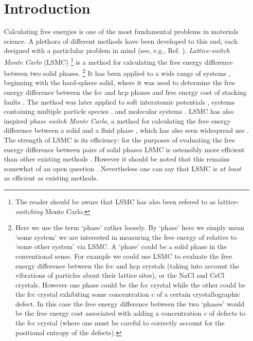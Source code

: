 \documentclass{report}
\begin{document}
\chapter{Introduction}
Calculating free energies is one of the most fundamental problems in materials science.
A plethora of different methods have been developed to this end, each designed with a particlular problem in mind (see, e.g., Ref. \cite{book:Frenkel}).
%
\emph{Lattice-switch Monte Carlo} (LSMC) \cite{Bruce_1997,Bruce_2000} 
\footnote{The reader should be aware that LSMC has also been refered to as lattice-\emph{switching} Monte Carlo.}
is a method for calculating the free energy difference between two solid phases.
\footnote{Here we use the term `phase' rather loosely. By `phase' here we simply mean `some system' we are interested 
in measuring the free energy of relative to `some other system' via LSMC. A `phase' could be a solid phase in the conventional sense. For 
example we could use LSMC to evaluate the free energy difference between the fcc and hcp crystals (taking into account the vibrations of particles 
about their lattice sites), or the NaCl and CsCl crystals. However one phase could be the fcc crystal while the other could be the fcc crystal 
exhibiting some concentration $c$ of a certain crystallographic defect. In this case the free energy difference between the two `phases' would be
the free energy cost associated with adding a concentration $c$ of defects to the fcc crystal (where one must be careful to correctly account
for the positional entropy of the defects).}
%
It has been applied to a wide range of systems \cite{Bruce_1997,Pronk_1999,Mau_1999,Bruce_2000,Jackson_2002,Jackson_2007,Yang_2008,
Marechal_2008,Raiteri_2010,Wilms_2012,Quigley_2014,Bridgwater_2014,Underwood_2015},
beginning with the hard-sphere solid, where it was used to determine the free energy difference
between the fcc and hcp phases \cite{Bruce_1997,Bruce_2000} and free energy cost of stacking faults
\cite{Pronk_1999,Mau_1999}. The method was later applied to soft interatomic potentials \cite{Jackson_2002,Wilms_2012,Underwood_2015}, 
systems containing multiple particle species \cite{Jackson_2007,Yang_2008}, and molecular systems 
\cite{Marechal_2008,Raiteri_2010,Quigley_2014,Bridgwater_2014}.
LSMC has also inspired \emph{phase switch Monte Carlo}, a method for calculating the free energy difference between a solid and a
fluid phase \cite{Wilding_2000}, which has also seen widespread use
\cite{Wilding_2000,Errington_2004,McNeil-Watson_2006,Wilding_2009_MP,Wilding_2009_JCP,Sollich_2010,Wilding_2010}.
%
The strength of LSMC is its efficiency: for the purposes of evaluating the free energy difference between pairs of solid phases LSMC is ostensibly
more efficient than other existing methods \cite{Wilms_2012,Marechal_2008}. 
However it should be noted that this remains somewhat of an open question \cite{Pronk_1999}. Nevertheless one can say that LSMC is 
\emph{at least} as efficient as existing methods. 
\end{document}
